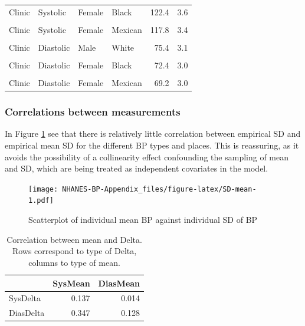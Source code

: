 \documentclass[
]{article}
\begin{document}
\begin{table}[!h]
\begin{tabular}[t]{llllrr}
Clinic & Systolic & Female & Black & 122.4 & 3.6\\
\cellcolor{gray!6}{Clinic} & \cellcolor{gray!6}{Systolic} & \cellcolor{gray!6}{Female} & \cellcolor{gray!6}{White} & \cellcolor{gray!6}{123.5} & \cellcolor{gray!6}{4.1}\\
Clinic & Systolic & Female & Mexican & 117.8 & 3.4\\
\addlinespace
\cellcolor{gray!6}{Clinic} & \cellcolor{gray!6}{Diastolic} & \cellcolor{gray!6}{Male} & \cellcolor{gray!6}{Black} & \cellcolor{gray!6}{77.8} & \cellcolor{gray!6}{3.1}\\
Clinic & Diastolic & Male & White & 75.4 & 3.1\\
\cellcolor{gray!6}{Clinic} & \cellcolor{gray!6}{Diastolic} & \cellcolor{gray!6}{Male} & \cellcolor{gray!6}{Mexican} & \cellcolor{gray!6}{74.9} & \cellcolor{gray!6}{3.2}\\
Clinic & Diastolic & Female & Black & 72.4 & 3.0\\
\cellcolor{gray!6}{Clinic} & \cellcolor{gray!6}{Diastolic} & \cellcolor{gray!6}{Female} & \cellcolor{gray!6}{White} & \cellcolor{gray!6}{70.5} & \cellcolor{gray!6}{3.0}\\
Clinic & Diastolic & Female & Mexican & 69.2 & 3.0\\
\bottomrule
\end{tabular}
\end{table}

\hypertarget{sec:correlations}{%
\subsubsection{Correlations between measurements}\label{sec:correlations}}

In Figure \ref{fig:SD-mean} see that there is relatively little correlation between empirical SD and empirical mean SD for the different BP types and places. This is reassuring, as it avoids the possibility of a collinearity effect confounding the sampling of mean and SD, which are being treated as independent covariates in the model.

\begin{figure}
\centering
\texttt{[image: NHANES-BP-Appendix\_files/figure-latex/SD-mean-1.pdf]}
\caption{\label{fig:SD-mean}Scatterplot of individual mean BP against individual SD of BP}
\end{figure}

\begin{table}

\caption{\label{tab:Delta-mean}Correlation between mean and Delta. Rows correspond to type of Delta, columns to type of mean.}
\centering
\begin{tabular}[t]{lrr}
\toprule
  & SysMean & DiasMean\\
\midrule
SysDelta & 0.137 & 0.014\\
DiasDelta & 0.347 & 0.128\\
\bottomrule
\end{tabular}
\end{table}
\end{document}
